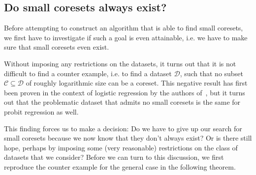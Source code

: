 \subsection{Do small coresets always exist?}

Before attempting to construct an algorithm that
is able to find small coresets, we first
have to investigate if such a goal is even attainable,
i.e. we have to make sure that small coresets even exist.

Without imposing any restrictions on the datasets, it turns out
that it is not difficult to find a counter example, i.e. to find
a dataset $\mathcal{D}$, such that no subset
$\mathcal{C} \subseteq \mathcal{D}$ of roughly logarithmic size
can be a coreset. This negative result has first been
proven in the context of logistic regression by the
authors of~\cite{on-coresets}, but it turns out that
the problematic dataset that admits no small coresets is
the same for probit regression as well.

This finding forces us to make a decision:
Do we have to give up our search for small coresets because
we now know that they don't always exist?
Or is there still hope, perhaps by imposing some (very reasonable)
restrictions on the class of datasets that we consider?
Before we can turn to this discussion, we first reproduce
the counter example for the general case in the following theorem.

